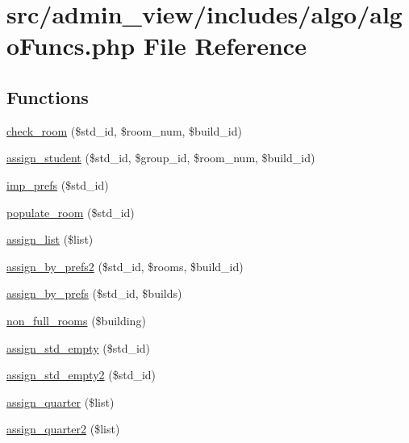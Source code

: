 \hypertarget{algoFuncs_8php}{\section{src/admin\-\_\-view/includes/algo/algo\-Funcs.php \-File \-Reference}
\label{algoFuncs_8php}
}
\subsection*{\-Functions}
\begin{DoxyCompactItemize}
\item 
\hyperlink{algoFuncs_8php_a0978ce5dc06e2a3474c5f6174b047e87}{check\-\_\-room} (\$std\-\_\-id, \$room\-\_\-num, \$build\-\_\-id)
\item 
\hyperlink{algoFuncs_8php_a9f6cf15a7de0e111a83f4fd027e56d2e}{assign\-\_\-student} (\$std\-\_\-id, \$group\-\_\-id, \$room\-\_\-num, \$build\-\_\-id)
\item 
\hyperlink{algoFuncs_8php_a08bada5204efb33fb5504a299c748820}{imp\-\_\-prefs} (\$std\-\_\-id)
\item 
\hyperlink{algoFuncs_8php_a501e20624843a1f718961adc7441f668}{populate\-\_\-room} (\$std\-\_\-id)
\item 
\hyperlink{algoFuncs_8php_ac654f557ca489d7fe9684885bc711ff5}{assign\-\_\-list} (\$list)
\item 
\hyperlink{algoFuncs_8php_a93fe7618cc2d6e57542bd01dcd80bede}{assign\-\_\-by\-\_\-prefs2} (\$std\-\_\-id, \$rooms, \$build\-\_\-id)
\item 
\hyperlink{algoFuncs_8php_a5bd2a3cc01c912d33fb37421b15b6cdd}{assign\-\_\-by\-\_\-prefs} (\$std\-\_\-id, \$builds)
\item 
\hyperlink{algoFuncs_8php_a19197469afa162da66f70127ed241472}{non\-\_\-full\-\_\-rooms} (\$building)
\item 
\hyperlink{algoFuncs_8php_a71ebc404ee2d8a756dc22ed2b1ff6621}{assign\-\_\-std\-\_\-empty} (\$std\-\_\-id)
\item 
\hyperlink{algoFuncs_8php_a59399a6e039580d0d4c017f01b521e0d}{assign\-\_\-std\-\_\-empty2} (\$std\-\_\-id)
\item 
\hyperlink{algoFuncs_8php_a4fa5bd5ac429115b83fa2485413e8c12}{assign\-\_\-quarter} (\$list)
\item 
\hyperlink{algoFuncs_8php_acd4506f38112d4063d2641679477a23b}{assign\-\_\-quarter2} (\$list)
\end{DoxyCompactItemize}


